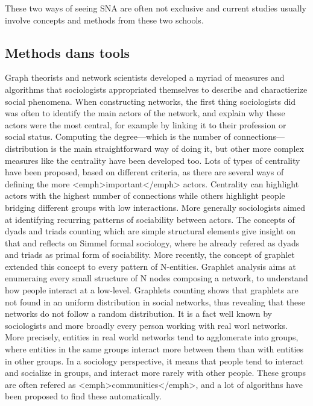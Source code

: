 These two ways of seeing SNA are often not exclusive and current studies usually involve concepts and methods from these two schools.

\subsection{Methods dans tools}

Graph theorists and network scientists developed a myriad of measures and algorithms that sociologists appropriated themselves to describe and charactierize social phenomena.
When constructing networks, the first thing sociologists did was often to identify the main actors of the network, and explain why these actors were the most central, for example by linking it to their profession or social status. Computing the degree---which is the number of connections---distribution is the main straightforward way of doing it, but other more complex measures like the centrality have been developed too.
Lots of types of centrality have been proposed, based on different criteria, as there are several ways of defining the more <emph>important</emph> actors. Centrality can highlight actors with the highest number of connections while others highlight people bridging different groups with low interactions.
More generally sociologists aimed at identifying recurring patterns of sociability between actors.
The concepts of dyads and triads counting which are simple structural elements give insight on that and reflects on Simmel formal sociology, where he already refered as dyads and triads as primal form of sociability. More recently, the concept of graphlet extended this concept to every pattern of N-entities. Graphlet analysis aims at enumeraing every small structure of N nodes composing a network, to understand how people interact at a low-level.
Graphlets counting shows that graphlets are not found in an uniform distribution in social networks, thus revealing that these networks do not follow a random distribution. It is a fact well known by sociologists and more broadly every person working with real worl networks. More precisely, entities in real world networks tend to agglomerate into groups, where entities in the same groups interact more between them than with entities in other groups. In a sociology perspective, it means that people tend to interact and socialize in groups, and interact more rarely with other people. These groups are often refered as <emph>communities</emph>, and a lot of algorithns have been proposed to find these automatically.



